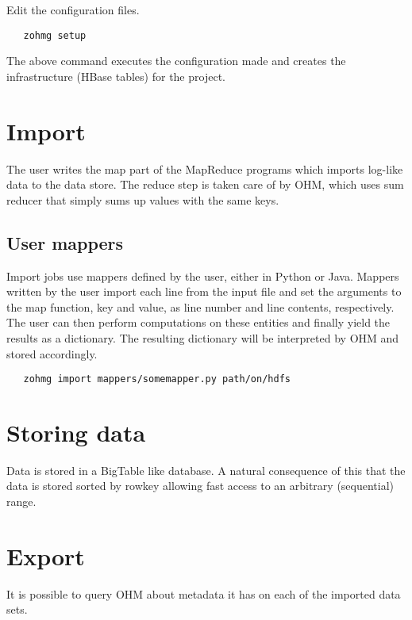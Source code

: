 \documentclass[a4paper,10pt]{book}
\begin{document}
\noindent Edit the configuration files.

\begin{verbatim}
   zohmg setup
\end{verbatim}

\noindent The above command executes the configuration made and creates the
infrastructure (HBase tables) for the project.


\section{Import}

The user writes the map part of the MapReduce programs which imports
log-like data to the data store. The reduce step is taken care of by OHM,
which uses sum reducer that simply sums up values with the same keys.


\subsection{User mappers}

Import jobs use mappers defined by the user, either in Python or Java.
Mappers written by the user import each line from the input file and set
the arguments to the map function, key and value, as line number and line
contents, respectively. The user can then perform computations on these
entities and finally yield the results as a dictionary. The resulting
dictionary will be interpreted by OHM and stored accordingly.

\begin{verbatim}
   zohmg import mappers/somemapper.py path/on/hdfs
\end{verbatim}


\section{Storing data}

Data is stored in a BigTable like database. A natural consequence of this
that the data is stored sorted by rowkey allowing fast access to an
arbitrary (sequential) range.



\section{Export}

It is possible to query OHM about metadata it has on each of the imported
data sets.
\end{document}
